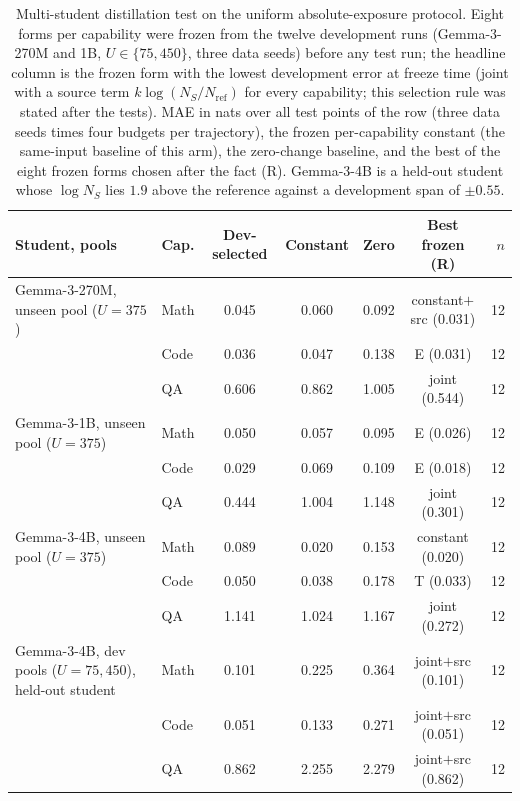 \begin{table}[H]
\centering\small
\caption{Multi-student distillation test on the uniform absolute-exposure protocol. Eight forms per capability were frozen from the twelve development runs (Gemma-3-270M and 1B, $U\in\{75,450\}$, three data seeds) before any test run; the headline column is the frozen form with the lowest development error at freeze time (joint with a source term $k\log(N_S/N_{\mathrm{ref}})$ for every capability; this selection rule was stated after the tests). MAE in nats over all test points of the row (three data seeds times four budgets per trajectory), the frozen per-capability constant (the same-input baseline of this arm), the zero-change baseline, and the best of the eight frozen forms chosen after the fact (R). Gemma-3-4B is a held-out student whose $\log N_S$ lies $1.9$ above the reference against a development span of $\pm0.55$.}
\label{tab:p2v2_test}
\begin{tabular}{llccccr}
\toprule
Student, pools & Cap. & Dev-selected & Constant & Zero & Best frozen (R) & $n$ \\
\midrule
Gemma-3-270M, unseen pool ($U{=}375$) & Math & 0.045 & 0.060 & 0.092 & constant$+$src (0.031) & 12 \\
 & Code & 0.036 & 0.047 & 0.138 & E (0.031) & 12 \\
 & QA & 0.606 & 0.862 & 1.005 & joint (0.544) & 12 \\
\addlinespace
Gemma-3-1B, unseen pool ($U{=}375$) & Math & 0.050 & 0.057 & 0.095 & E (0.026) & 12 \\
 & Code & 0.029 & 0.069 & 0.109 & E (0.018) & 12 \\
 & QA & 0.444 & 1.004 & 1.148 & joint (0.301) & 12 \\
\addlinespace
Gemma-3-4B, unseen pool ($U{=}375$) & Math & 0.089 & 0.020 & 0.153 & constant (0.020) & 12 \\
 & Code & 0.050 & 0.038 & 0.178 & T (0.033) & 12 \\
 & QA & 1.141 & 1.024 & 1.167 & joint (0.272) & 12 \\
\addlinespace
Gemma-3-4B, dev pools ($U{=}75,450$), held-out student & Math & 0.101 & 0.225 & 0.364 & joint$+$src (0.101) & 12 \\
 & Code & 0.051 & 0.133 & 0.271 & joint$+$src (0.051) & 12 \\
 & QA & 0.862 & 2.255 & 2.279 & joint$+$src (0.862) & 12 \\
\bottomrule
\end{tabular}
\end{table}
